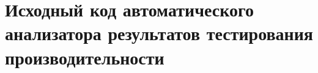 \chapter{Исходный код автоматического анализатора результатов тестирования производительности}
\label{application:analyser}
